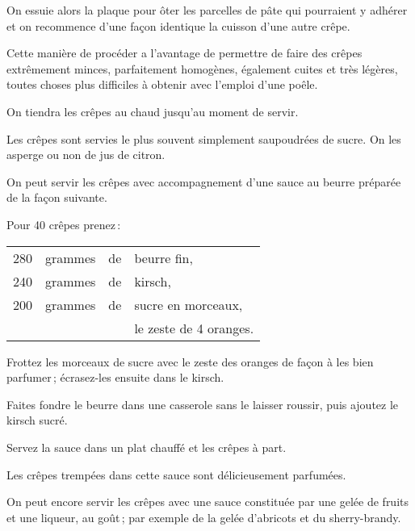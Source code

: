 On essuie alors la plaque pour ôter les parcelles de pâte qui pourraient y
adhérer et on recommence d'une façon identique la cuisson d'une autre crêpe.

Cette manière de procéder a l'avantage de permettre de faire des crêpes
extrêmement minces, parfaitement homogènes, également cuites et très légères,
toutes choses plus difficiles à obtenir avec l'emploi d'une poêle.

On tiendra les crêpes au chaud jusqu'au moment de servir.

Les crêpes sont servies le plus souvent simplement saupoudrées de sucre.
On les asperge ou non de jus de citron.

\sk

On peut servir les crêpes avec accompagnement d'une sauce au beurre préparée
de la façon suivante.

\medskip

Pour 40 crêpes prenez :

\footnotesize
\begin{longtable}{rrrp{16em}}
    280 & grammes & de & beurre fin,                                                                      \\
    240 & grammes & de & kirsch,                                                                          \\
    200 & grammes & de & sucre en morceaux,                                                               \\
        &         &    & le zeste de 4 oranges.                                                           \\
\end{longtable}
\normalsize

Frottez les morceaux de sucre avec le zeste des oranges de façon à les bien
parfumer ; écrasez-les ensuite dans le kirsch.

Faites fondre le beurre dans une casserole sans le laisser roussir, puis ajoutez
le kirsch sucré.

Servez la sauce dans un plat chauffé et les crêpes à part.

Les crêpes trempées dans cette sauce sont délicieusement parfumées.

\sk

On peut encore servir les crêpes avec une sauce constituée par une gelée de
fruits et une liqueur, au goût ; par exemple de la gelée d’abricots et du
sherry-brandy.

\sk

